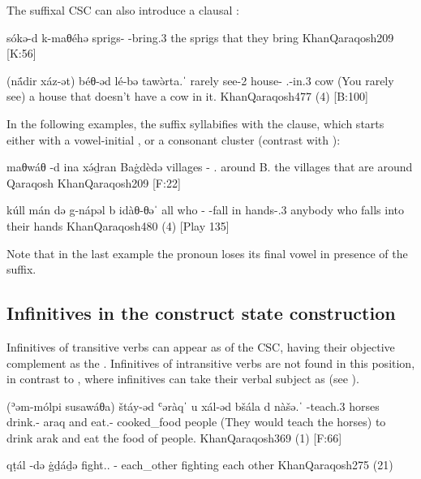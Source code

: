 The suffixal CSC can also introduce a clausal \secn:

{sókə-d k-maθéhə}
{sprigs-\cst{} \ind-bring.3\pl}
{the sprigs that they bring}
{KhanQaraqosh}{209 {[K:56]}}

{(nā́dir xáz-ət) béθ-əd lé-bə tawə̀rta.ˈ}
{rarely see-2\masc{} house-\cst{} \neg.\exist-in.3\masc{} cow}
{(You rarely see) a house that doesn't have a cow in it.}
{KhanQaraqosh}{477 (4) {[B:100]}}

\newpage 
In the following examples, the \cst* suffix syllabifies with the clause, which starts either with a vowel-initial , or a consonant cluster (contrast with ):

{maθwáθ -d\cb{} ina\cb{} xə́ḏran Baġdèdə}
{villages -\cst\cb{} \cop.\pl\cb{} around B.}
{the villages that are around Qaraqosh}
{KhanQaraqosh}{209 {[F:22]}}


{kúll mán də\cb{} g-nápəl b\cb{} idàθ-θəˈ}
{all who -\cst\cb{} \ind-fall in\cb{} hands-\poss.3\pl}
{anybody who falls into their hands}
{KhanQaraqosh}{480 (4) {[Play 135]}}

Note that in the last example the pronoun  loses its final  vowel in presence of the \cst* suffix. 

\subsection{Infinitives in the construct state construction} \label{ss:Qar_CSC_inf}

Infinitives of transitive verbs can appear as \prims of the CSC, having their objective complement as the \secn. Infinitives of intransitive verbs are not found in this position, in contrast to \JZax, where  infinitives can take their verbal subject as \secns (see ).

{(ʾəm-mólpi susawáθa) štáy-əd ʿəràqˈ u\cb{}  xál-əd bšála d\cb{}  nàšə.ˈ}
{\fut-teach.3\pl{} horses drink.\inf-\cst{} araq and\cb{}  eat.\inf-\cst{} cooked\_food \lnk\cb{}  people}
{(They would teach the horses) to drink arak and eat the food of people.}
{KhanQaraqosh}{369 (1) {[F:66]}}

{qṭál -də\cb{} ġḏáḏə}
{fight.\inf.\cst{} -\cst\cb{} each\_other}
{fighting each other}
{KhanQaraqosh}{275 (21)}

